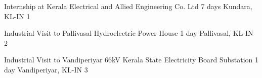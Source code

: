 

\begin{cvhonors}

  \cvhonor
    {Internship at Kerala Electrical and Allied Engineering Co. Ltd} %
    {7 days} %
    {Kundara, KL-IN} %
    {1} %

  \cvhonor
    {Industrial Visit to Pallivasal Hydroelectric Power House} %
    {1 day} %
    {Pallivasal, KL-IN} %
    {2} %

  \cvhonor
    {Industrial Visit to Vandiperiyar 66kV Kerala State Electricity Board Substation} %
    {1 day} %
    {Vandiperiyar, KL-IN} %
    {3} %

    
\end{cvhonors}
